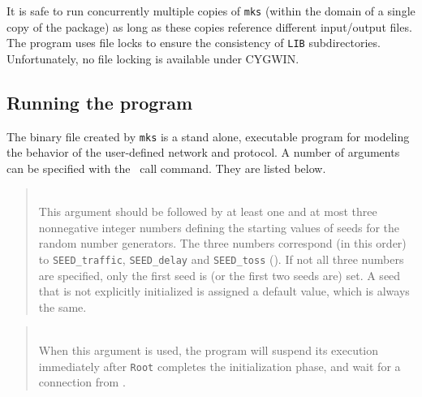 It is safe to run concurrently
multiple copies of {\tt mks} (within the domain of a single
copy of the package) as long as these copies reference different input/output
files.
The program uses file locks to ensure the consistency of {\tt LIB}
subdirectories.
Unfortunately, no file locking is available under CYGWIN.

\subsection{Running the program}
\label{rm_un_ru}

The binary file created by {\tt mks} is a stand alone, executable
program for modeling the behavior of the user-defined network and
protocol.
A number of arguments can be specified with the \smurphtts\ call
command.
They are listed below.

\medskip

\begin{quote}
\noindent{}\\ \hspace{0in}
This argument should be followed by at least one and at most three
nonnegative integer numbers defining the starting values of seeds for
the random number generators.
The three numbers correspond (in this order) to {\tt SEED\_traffic},
{\tt SEED\_delay} and {\tt SEED\_toss} ().
If not all three numbers are specified, only the first seed is (or the first
two seeds are) set.
A seed that is not explicitly initialized is assigned a default value, which
is always the same.
\end{quote}

\begin{quote}
\noindent{}\\ \hspace{0in}
When this argument is used, the program will suspend its execution
immediately after {\tt Root} completes the initialization phase,
and wait for a connection from \dsd.
\end{quote}

